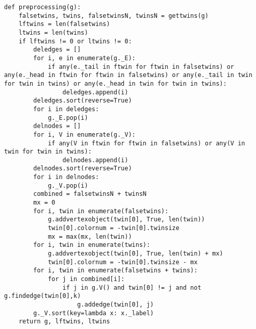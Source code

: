 \documentclass[twoside]{article}
\theoremstyle{definition}
\theoremstyle{plain}
\begin{document}
\begin{appendices}
\begin{lstlisting}[label={preprocessing}]
def preprocessing(g):
	falsetwins, twins, falsetwinsN, twinsN = gettwins(g)
	lftwins = len(falsetwins)
	ltwins = len(twins)
	if lftwins != 0 or ltwins != 0:
		deledges = []
		for i, e in enumerate(g._E):
			if any(e._tail in ftwin for ftwin in falsetwins) or any(e._head in ftwin for ftwin in falsetwins) or any(e._tail in twin for twin in twins) or any(e._head in twin for twin in twins):
				deledges.append(i)
		deledges.sort(reverse=True)
		for i in deledges:
			g._E.pop(i)
		delnodes = []
		for i, V in enumerate(g._V):
			if any(V in ftwin for ftwin in falsetwins) or any(V in twin for twin in twins):
				delnodes.append(i)
		delnodes.sort(reverse=True)
		for i in delnodes:
			g._V.pop(i)
		combined = falsetwinsN + twinsN
		mx = 0
		for i, twin in enumerate(falsetwins):
			g.addvertexobject(twin[0], True, len(twin))
			twin[0].colornum = -twin[0].twinsize
			mx = max(mx, len(twin))
		for i, twin in enumerate(twins):
			g.addvertexobject(twin[0], True, len(twin) + mx)
			twin[0].colornum = -twin[0].twinsize - mx
		for i, twin in enumerate(falsetwins + twins):
			for j in combined[i]:
				if j in g.V() and twin[0] != j and not g.findedge(twin[0],k)
					g.addedge(twin[0], j)
		g._V.sort(key=lambda x: x._label)
	return g, lftwins, ltwins
\end{lstlisting}

\end{appendices}
\end{document}
